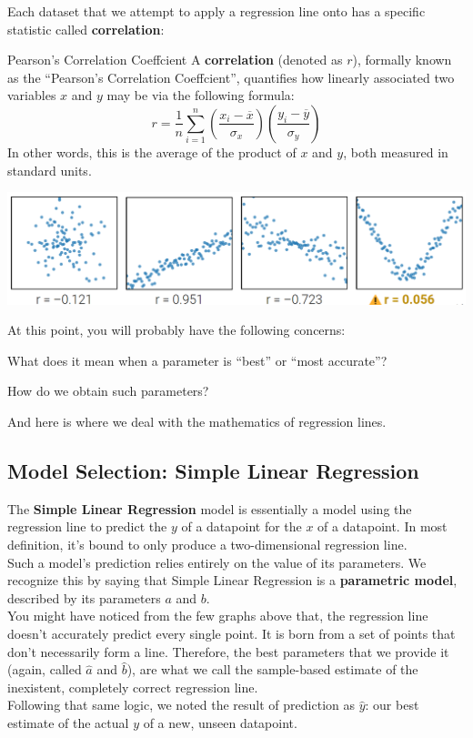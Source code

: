 Each dataset that we attempt to apply a regression line onto has a specific statistic called \textbf{correlation}:
\begin{ln-define}{Pearson's Correlation Coeffcient}{}
    A \textbf{correlation} (denoted as $r$), formally known as the ``Pearson's Correlation Coeffcient'', quantifies how linearly associated two variables $x$ and $y$ may be via the following formula:
    \[r = \frac{1}{n} \sum_{i = 1}^n (\frac{x_i - \overline{x}}{\sigma_x})(\frac{y_i - \overline{y}}{\sigma_y})\]
    In other words, this is the average of the product of $x$ and $y$, both measured in standard units.
    \begin{center}
        \includegraphics[scale=0.4]{figs/ln01/linear-correlation.png}
    \end{center}
\end{ln-define}

At this point, you will probably have the following concerns:
\begin{bindenum}
    \item What does it mean when a parameter is ``best'' or ``most accurate''?
    \item How do we obtain such parameters?
\end{bindenum}
And here is where we deal with the mathematics of regression lines.

\subsection{Model Selection: Simple Linear Regression}
The \textbf{Simple Linear Regression} model is essentially a model using the regression line to predict the $y$ of a datapoint for the $x$ of a datapoint. In most definition, it's bound to only produce a two-dimensional regression line. \\
Such a model's prediction relies entirely on the value of its parameters. We recognize this by saying that Simple Linear Regression is a \textbf{parametric model}, described by its parameters $a$ and $b$. \\
You might have noticed from the few graphs above that, the regression line doesn't accurately predict every single point. It is born from a set of points that don't necessarily form a line. Therefore, the best parameters that we provide it (again, called $\hat{a}$ and $\hat{b}$), are what we call the sample-based estimate of the inexistent, completely correct regression line. \\
Following that same logic, we noted the result of prediction as $\hat{y}$: our best estimate of the actual $y$ of a new, unseen datapoint.

